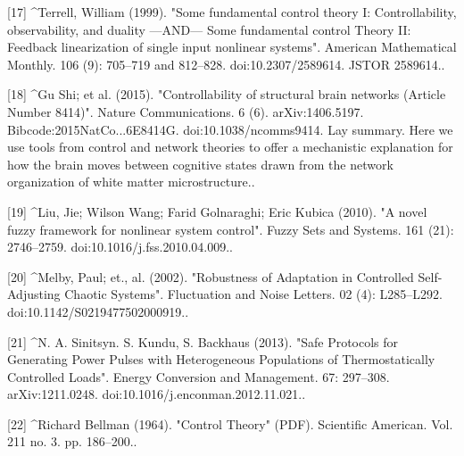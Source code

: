 [17]
^Terrell, William (1999). "Some fundamental control theory I: Controllability, observability, and duality —AND— Some fundamental control Theory II: Feedback linearization of single input nonlinear systems". American Mathematical Monthly. 106 (9): 705–719 and 812–828. doi:10.2307/2589614. JSTOR 2589614..

[18]
^Gu Shi; et al. (2015). "Controllability of structural brain networks (Article Number 8414)". Nature Communications. 6 (6). arXiv:1406.5197. Bibcode:2015NatCo...6E8414G. doi:10.1038/ncomms9414. Lay summary. Here we use tools from control and network theories to offer a mechanistic explanation for how the brain moves between cognitive states drawn from the network organization of white matter microstructure..

[19]
^Liu, Jie; Wilson Wang; Farid Golnaraghi; Eric Kubica (2010). "A novel fuzzy framework for nonlinear system control". Fuzzy Sets and Systems. 161 (21): 2746–2759. doi:10.1016/j.fss.2010.04.009..

[20]
^Melby, Paul; et., al. (2002). "Robustness of Adaptation in Controlled Self-Adjusting Chaotic Systems". Fluctuation and Noise Letters. 02 (4): L285–L292. doi:10.1142/S0219477502000919..

[21]
^N. A. Sinitsyn. S. Kundu, S. Backhaus (2013). "Safe Protocols for Generating Power Pulses with Heterogeneous Populations of Thermostatically Controlled Loads". Energy Conversion and Management. 67: 297–308. arXiv:1211.0248. doi:10.1016/j.enconman.2012.11.021..

[22]
^Richard Bellman (1964). "Control Theory" (PDF). Scientific American. Vol. 211 no. 3. pp. 186–200..